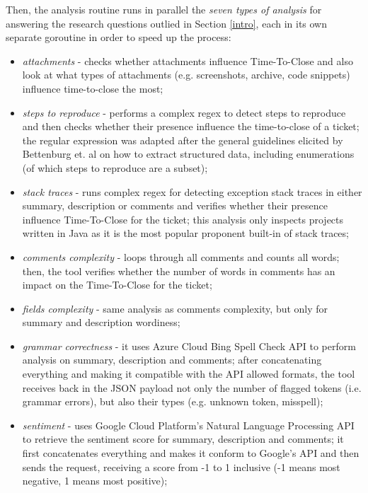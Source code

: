 \documentclass{mpaper}
\begin{document}
Then, the analysis routine runs in parallel the \emph{seven types of analysis} for answering the research questions 
outlied in Section \ref{intro}, each in its own separate goroutine in order to speed up the process:
\begin{itemize}
  \item \emph{attachments} - checks whether attachments influence Time-To-Close and also look at what types 
  of attachments (e.g. screenshots, archive, code snippets) influence time-to-close the most;
  \item \emph{steps to reproduce} - performs a complex regex to detect steps to reproduce and then checks whether their presence
  influence the time-to-close of a ticket; the regular expression was adapted after the general guidelines elicited by 
  Bettenburg et. al \cite{bettenburg2008extracting} on how to extract structured data, including enumerations (of which 
  steps to reproduce are a subset);
  \item \emph{stack traces} - runs complex regex for detecting exception stack traces in either summary, description or comments 
  and verifies whether their presence influence Time-To-Close for the ticket; this analysis only inspects projects
  written in Java as it is the most popular proponent built-in of stack traces;
  \item \emph{comments complexity} - loops through all comments and counts all words; then, the tool verifies whether 
  the number of words in comments has an impact on the Time-To-Close for the ticket;
  \item \emph{fields complexity} - same analysis as comments complexity, but only for summary and description wordiness;
  \item \emph{grammar correctness} - it uses Azure Cloud Bing Spell Check API to perform analysis on summary, 
  description and comments; after concatenating everything and making it compatible with the API allowed formats, the tool 
  receives back in the JSON payload not only the number of flagged tokens (i.e. grammar errors), but also their types 
  (e.g. unknown token, misspell);
  \item \emph{sentiment} - uses Google Cloud Platform's Natural Language Processing API to retrieve the 
  sentiment score for summary, description and comments; it first concatenates everything and makes it conform to Google's 
  API and then sends the request, receiving a score from -1 to 1 inclusive (-1 means most negative, 1 means most 
  positive);
\end{itemize}
\end{document}
